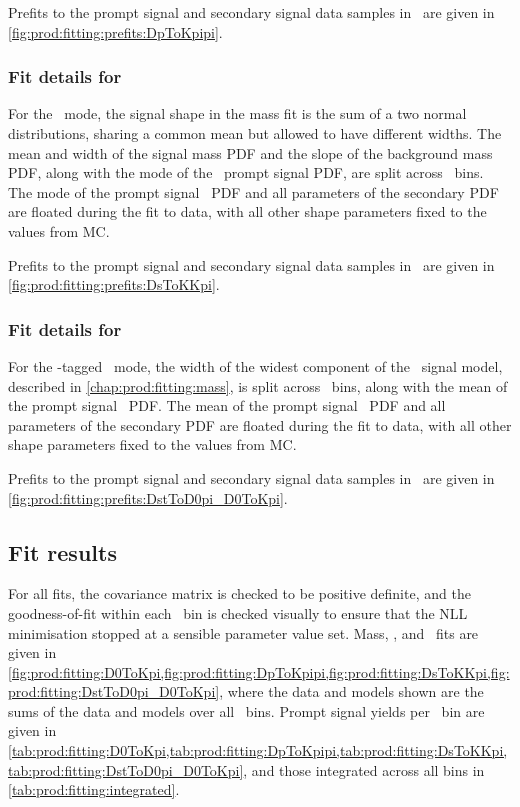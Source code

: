 Prefits to the prompt signal and secondary signal data samples in \lnipchisq\ 
are given in \cref{fig:prod:fitting:prefits:DpToKpipi}.

\subsubsection*{Fit details for \PDsplus}
\label{chap:prod:fitting:details:DsToKKpi}

For the \DspTophipi\ mode, the signal shape in the mass fit is the sum of a two 
normal distributions, sharing a common mean but allowed to have different 
widths.
The mean and width of the signal mass \ac{PDF} and the slope of the background 
mass \ac{PDF}, along with the mode of the \lnipchisq\ prompt signal \ac{PDF}, 
are split across \pTy\ bins.
The mode of the prompt signal \lnipchisq\ \ac{PDF} and all parameters of the 
secondary \ac{PDF} are floated during the fit to data, with all other shape 
parameters fixed to the values from \ac{MC}.

Prefits to the prompt signal and secondary signal data samples in \lnipchisq\ 
are given in \cref{fig:prod:fitting:prefits:DsToKKpi}.

\subsubsection*{Fit details for \PDstarp}
\label{chap:prod:fitting:details:DstToD0pi}

For the \PDstarp-tagged \DzToKpi\ mode, the width of the widest component of 
the \deltam\ signal model, described in \cref{chap:prod:fitting:mass}, is split 
across \pTy\ bins, along with the mean of the prompt signal \lnipchisq\ 
\ac{PDF}.
The mean of the prompt signal \lnipchisq\ \ac{PDF} and all parameters of the 
secondary \ac{PDF} are floated during the fit to data, with all other shape 
parameters fixed to the values from \ac{MC}.

Prefits to the prompt signal and secondary signal data samples in \PDzero 
\lnipchisq\ are given in \cref{fig:prod:fitting:prefits:DstToD0pi_D0ToKpi}.

\subsection{Fit results}
\label{chap:prod:fitting:results}

For all fits, the covariance matrix is checked to be positive definite, and the 
goodness-of-fit within each \pTy\ bin is checked visually to ensure that the 
\ac{NLL} minimisation stopped at a sensible parameter value set.
Mass, \deltam, and \lnipchisq\ fits are given in 
\cref{fig:prod:fitting:D0ToKpi,fig:prod:fitting:DpToKpipi,fig:prod:fitting:DsToKKpi,fig:prod:fitting:DstToD0pi_D0ToKpi}, 
where the data and models shown are the sums of the data and models over all 
\pTy\ bins.
Prompt signal yields per \pTy\ bin are given in 
\cref{tab:prod:fitting:D0ToKpi,tab:prod:fitting:DpToKpipi,tab:prod:fitting:DsToKKpi,tab:prod:fitting:DstToD0pi_D0ToKpi}, 
and those integrated across all bins in \cref{tab:prod:fitting:integrated}.

